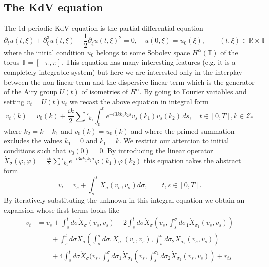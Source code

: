 \documentclass[a4paper,11pt,reqno]{article}
\newcommand{\1}{{\bf 1}}
\newcommand{\RR}{\mathbb{R}}
\newcommand{\ZZ}{\mathcal{Z}}
\newcommand{\bTT}{\mathbb T}
\begin{document}
\subsection{The KdV equation}
The 1d periodic KdV equation is the partial differential equation
\begin{equation}
  \label{eq:kdv-real}
\partial_t u(t,\xi) + \partial^3_\xi u(t,\xi) +
\frac12 \partial_\xi u(t,\xi)^2 = 0,\quad u(0,\xi) = u_0(\xi), \qquad
(t,\xi)\in\RR\times \bTT  
\end{equation}
where  the initial condition $u_0$ belongs to some Sobolev space $H^\alpha(\bTT)$
of the torus $\bTT = [-\pi,\pi]$. This equation has many interesting
features (e.g. it is a completely integrable system) but here we are
interested only in the interplay between the non-linear term and the
dispersive linear term which is the generator of the Airy group
$U(t)$ of isometries
of $H^{\alpha}$. By going to Fourier variables and setting
$v_t = U(t) u_t$ we recast the above equation in integral
form
\begin{equation}
  \label{eq:kdv-base}
 v_t(k) =   v_0(k) + \frac{ik}2 \sum'_{k_1} \int_0^t e^{- i 3 k k_1 k_2 s}
  v_s(k_1) v_s(k_2) \, ds, \quad t \in [0,T], k \in \ZZ_* 
\end{equation}
where $k_2 = k-k_1$ and $v_0(k) = u_0(k)$ and where the primed
summation excludes the values $k_1 = 0$ and $k_1 = k$. We restrict our attention to
initial conditions such that $v_0(0) = 0$. By introducing the linear
operator
$
\dot X_\sigma(\varphi,\varphi) = \frac{ik}2 \sum'_{k_1} e^{- i 3 k k_1 k_2 \sigma}
  \varphi(k_1) \varphi(k_2)
$
this equation takes the abstract form
$$
v_t = v_s + \int_s^t \dot X_\sigma(v_\sigma,v_\sigma) d\sigma, \qquad
t,s \in [0,T].
$$
By iteratively substituting the unknown in this integral equation we
obtain an expansion whose first terms looks like
\begin{equation}
\label{eq:tree-series-kdv}
  \begin{split}
v_t & = v_s + \int_s^t d\sigma \dot X_\sigma(v_s,v_s)
+ 2 \int_s^t d\sigma \dot X_\sigma(v_s,\int_s^\sigma d\sigma_1 \dot
X_{\sigma_1}(v_s,v_s))
\\ &\qquad +\int_s^t d\sigma \dot X_\sigma(\int_s^\sigma d\sigma_1 \dot X_{\sigma_1}(v_s,v_s),\int_s^\sigma d\sigma_2 \dot X_{\sigma_2}(v_s,v_s))    
\\ &\qquad +4 \int_s^t d\sigma \dot X_\sigma(v_s,\int_s^\sigma
d\sigma_1 \dot X_{\sigma_1}(v_s,\int_s^{\sigma_1} d\sigma_2 \dot
X_{\sigma_2}(v_s,v_s))  + r_{ts}  
  \end{split}
\end{equation}
\end{document}
